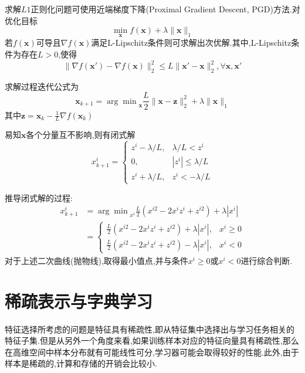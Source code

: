 求解$L1$正则化问题可使用近端梯度下降(Proximal Gradient Descent, PGD)方法.对优化目标
\begin{equation}
\min_\mathbf{x}f(\mathbf{x})+\lambda\|\mathbf{x}\|_1
\end{equation}
若$f(\mathbf{x})$可导且$\nabla f(\mathbf{x})$满足L-Lipschitz条件则可求解出次优解.其中,L-Lipschitz条件为存在$L>0$,使得
\begin{equation}
\|\nabla f(\mathbf{x}')-\nabla f(\mathbf{x})\|_2^2\le L\|\mathbf{x}'-\mathbf{x}\|_2^2,\forall\mathbf{x},\mathbf{x}'
\end{equation}

求解过程迭代公式为
\begin{equation}
\mathbf{x}_{k+1}={\arg\min}_{\mathbf{x}}\frac{L}{2}\|\mathbf{x-z}\|_2^2+\lambda\|\mathbf{x}\|_1
\end{equation}
其中$\mathbf{z=x}_k-\frac{1}{L}\nabla f(\mathbf{x}_k)$

易知$\mathbf{x}$各个分量互不影响,则有闭式解
\begin{equation}
x_{k+1}^i=
\begin{cases}
z^i-\lambda/L,&\lambda/L<z^i\\
0,&|z^i|\le \lambda/L\\
z^i+\lambda/L,& z^i<-\lambda/L
\end{cases}
\end{equation}

推导闭式解的过程:
\begin{equation}
\begin{split}
x_{k+1}^i&={\arg\min}_{x^i}\frac{L}{2}(x^{i2}-2x^iz^i+z^{i2})+\lambda|x^i|\\
&=\begin{cases}
\frac{L}{2}(x^{i2}-2x^iz^i+z^{i2})+\lambda|x^i|,&x^i\ge0\\
\frac{L}{2}(x^{i2}-2x^iz^i+z^{i2})-\lambda|x^i|,&x^i<0
\end{cases}\end{split}
\end{equation}
对于上述二次曲线(抛物线),取得最小值点,并与条件$x^i\ge0$或$x^i<0$进行综合判断.

\section{稀疏表示与字典学习}

特征选择所考虑的问题是特征具有稀疏性,即从特征集中选择出与学习任务相关的特征子集.但是从另外一个角度来看,如果训练样本对应的特征向量具有稀疏性,那么在高维空间中样本分布就有可能线性可分,学习器可能会取得较好的性能.此外,由于样本是稀疏的,计算和存储的开销会比较小.

